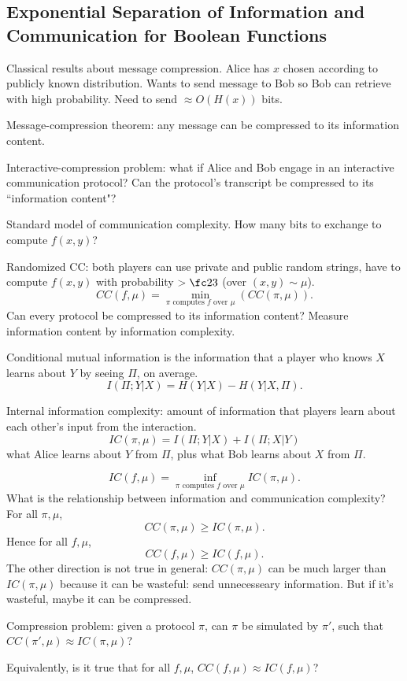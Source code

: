 \subsection{Exponential Separation of Information and Communication for Boolean Functions}

Classical results about message compression. Alice has $x$ chosen according to publicly known distribution. Wants to send message to Bob so Bob can retrieve with high probability. Need to send $\approx O(H(x))$ bits.

Message-compression theorem: any message can be compressed to its information content.

Interactive-compression problem: what if Alice and Bob engage in an interactive communication protocol? Can the protocol's transcript be compressed to its ``information content"?

Standard model of communication complexity. How many bits to exchange to compute $f(x,y)$?

Randomized CC: both players can use private and public random strings, have to compute $f(x,y)$ with probability $>\fc 23$ (over $(x,y)\sim \mu$). 
\[
CC(f,\mu)=\min_{\pi \text{ computes }f\text{ over }\mu}(CC(\pi,\mu)).
\]
Can every protocol be compressed to its information content? Measure information content by information complexity.

Conditional mutual information is the information that a player who knows $X$ learns about $Y$ by seeing $\Pi$, on average.
\[
I(\Pi;Y|X)=H(Y|X)-H(Y|X,\Pi).
\]

Internal information complexity: amount of information that players learn about each other's input from the interaction.
\[
IC(\pi,\mu)=I(\Pi;Y|X)+I(\Pi;X|Y)
\]
what Alice learns about $Y$ from $\Pi$, plus what Bob learns about $X$ from $\Pi$.

\[
IC(f,\mu)=\inf_{\pi \text{ computes }f\text{ over }\mu} IC(\pi,\mu).
\]
What is the relationship between information and communication complexity?
For all $\pi,\mu$,
\[
CC(\pi,\mu)\ge IC(\pi,\mu).
\]
Hence for all $f,\mu$, 
\[
CC(f,\mu) \ge IC(f,\mu).
\]
The other direction is not true in general: $CC(\pi,\mu)$ can be much larger than $IC(\pi,\mu)$ because it can be wasteful: send unnecesseary information. But if it's wasteful, maybe it can be compressed.

Compression problem: given a protocol $\pi$, can $\pi$ be simulated by $\pi'$, such that $CC(\pi',\mu)\approx IC(\pi,\mu)$? 

Equivalently, is it true that for all $f,\mu$, $CC(f,\mu)\approx IC(f,\mu)$?

